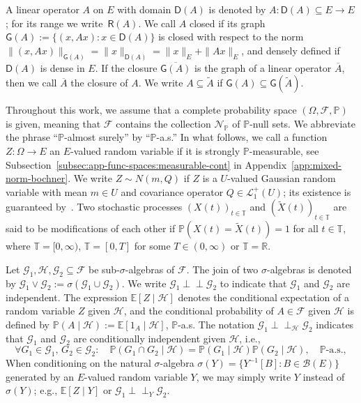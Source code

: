 \documentclass[reqno]{amsart}
\numberwithin{equation}{section}
\newcommand{\bbP}{\mathbb{P}}
\newcommand{\bbR}{\mathbb{R}}
\newcommand{\bbT}{\mathbb{T}}
\newcommand{\E}{\mathbb{E}}
\newcommand{\cB}{\mathcal{B}}
\newcommand{\cF}{\mathcal{F}}
\newcommand{\cG}{\mathcal{G}}
\newcommand{\cH}{\mathcal{H}}
\newcommand{\cN}{\mathcal{N}}
\newcommand{\norm}[2]{     \| #1       \|_{ #2 }}
\newcommand{\from}{\colon}
\newcommand{\clos}[1]{\overline{ #1 }}
\newcommand{\dom}[1]{\mathsf D(#1)}
\newcommand{\ind}{\perp\!\!\!\perp}
\theoremstyle{remark}
\theoremstyle{definition}
\begin{document}
A linear operator $A$ on $E$ with domain $\mathsf D(A)$ 
is denoted by ${A\from \mathsf D(A) \subseteq E \to E}$;
for its range we write~$\mathsf R(A)$. 
We call $A$ closed if its graph 
$\mathsf G(A):= {\{(x,Ax): x \in \mathsf D(A)\}}$ 
is closed with respect to the norm 
$\norm{(x,Ax)}{\mathsf G(A)} = \norm{x}{\dom{A}} = \norm{x}{E} + \norm{Ax}{E}$, 
and densely defined if $\mathsf D(A)$ is dense in $E$. 
If the closure $\clos{\mathsf G(A)}$ is the graph of a linear operator $\clos A$, 
then we call $\clos A$ the closure of $A$.
We write $A \subseteq \widetilde A$ if $\mathsf G(A) \subseteq \mathsf G(\widetilde A)$.


Throughout this work, we assume that a complete probability space
$(\Omega,\cF,\bbP)$ is given,
meaning that $\cF$ contains the collection $\cN_{\bbP}$ of $\bbP$-null sets.
We abbreviate the phrase ``$\bbP$-almost surely'' by ``$\bbP$-a.s.''
In what follows, we call
a function $Z\from \Omega \to E$
an $E$-valued random variable if it is strongly $\bbP$-measurable, see 
Subsection~\ref{subsec:app-func-spaces:measurable-cont} in Appendix~\ref{app:mixed-norm-bochner}.
We write $Z \sim N(m, Q)$ if $Z$ is a $U$-valued Gaussian random variable
with mean $m \in U$ and covariance operator $Q \in \mathscr L^+_1(U)$;
its existence is guaranteed by~\cite[Theorem~2.3.1]{Bogachev1998}.
Two stochastic processes $(X(t))_{t \in \bbT}$ and
$(\widetilde X(t))_{t \in \bbT}$ are said to be modifications
of each other if $\bbP(X(t) = \widetilde X(t)) = 1$ for all $t \in \bbT$,
where $\bbT = [0,\infty)$, $\bbT = [0,T]$ for some $T \in (0,\infty)$ or $\bbT = \bbR$.

Let $\cG_1,\cH,\cG_2\subseteq \cF$ be sub-$\sigma$-algebras of $\cF$. 
The join of two $\sigma$-algebras is denoted by $\cG_1 \vee \cG_2 := \sigma(\cG_1 \cup \cG_2)$.
We write $\cG_1 \ind \cG_2$ to indicate that $\cG_1$ and $\cG_2$ are independent.
The expression $\E[Z \mid \cH]$ denotes the conditional expectation of a random variable $Z$ given $\cH$,
and the conditional probability of $A \in \cF$ given $\cH$ is defined by $\bbP(A \mid \cH) := \E[1_{A} \mid \cH]$, $\bbP$-a.s.
The notation $\cG_1 \ind_{\cH} \cG_2$ indicates that
$\cG_1$ and $\cG_2$ are conditionally independent given $\cH$, i.e.,
%
\begin{equation}
	\forall 
	G_1 \in \cG_1, \, G_2 \in \cG_2 : \quad  
	\bbP(G_1 \cap G_2 \mid \cH) 
	=
	\bbP(G_1 \mid \cH)\bbP(G_2 \mid \cH), \quad \bbP\text{-a.s.},
\end{equation}
%
When conditioning on
the natural $\sigma$-algebra $\sigma(Y) = \{ Y^{-1}[B] : B \in \cB(E)\}$ generated
by an $E$-valued random variable $Y$, 
we may simply write $Y$ instead of $\sigma(Y)$; e.g., $\E[Z \mid Y]$ or $\cG_1 \ind_{Y} \cG_2$.
\end{document}

